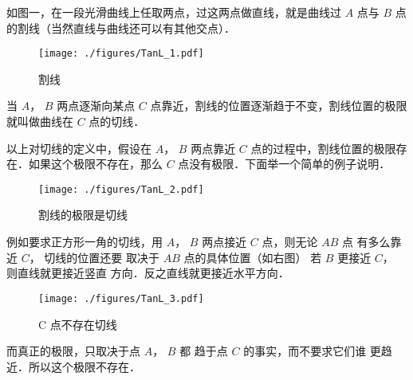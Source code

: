 

如图一，在一段光滑曲线上任取两点，过这两点做直线，就是曲线过 $A$ 点与 $B$ 点的割线（当然直线与曲线还可以有其他交点）．
\begin{figure}[ht]
\centering
\texttt{[image: ./figures/TanL\_1.pdf]}
\caption{割线} \label{TanL_fig1}
\end{figure}
当 $A$，  $B$ 两点逐渐向某点 $C$ 点靠近，割线的位置逐渐趋于不变，割线位置的极限就叫做曲线在 $C$ 点的切线．

以上对切线的定义中，假设在 $A$，  $B$ 两点靠近 $C$ 点的过程中，割线位置的极限存在．如果这个极限不存在，那么 $C$ 点没有极限．下面举一个简单的例子说明．

\begin{figure}[ht]
\vskip 0pt
\centering
\texttt{[image: ./figures/TanL\_2.pdf]}
\caption{割线的极限是切线} \label{TanL_fig2}
\end{figure}
例如要求正方形一角的切线，用
 $A$，  $B$ 两点接近 $C$ 点，则无论 $AB$ 点
有多么靠近 $C$， 切线的位置还要
取决于 $AB$ 点的具体位置（如右图）
若 $B$ 更接近 $C$， 则直线就更接近竖直
方向．反之直线就更接近水平方向．

\begin{figure}[ht]
\centering
\texttt{[image: ./figures/TanL\_3.pdf]}
\caption{C 点不存在切线} \label{TanL_fig3}
\end{figure}

而真正的极限，只取决于点 $A$，  $B$ 都
趋于点 $C$ 的事实，而不要求它们谁
更趋近．所以这个极限不存在．
